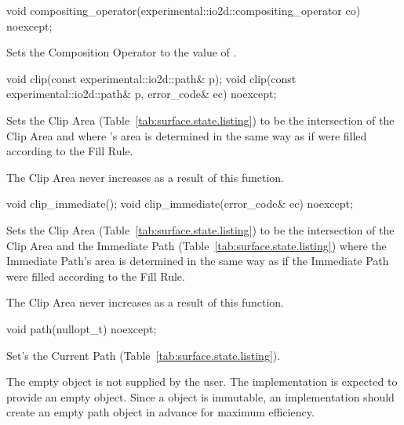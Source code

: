 \begin{itemdecl}
void compositing_operator(experimental::io2d::compositing_operator co)
  noexcept;
\end{itemdecl}
\begin{itemdescr}
\pnum
\effects
Sets the Composition Operator to the value of .
\end{itemdescr}

\begin{itemdecl}
void clip(const experimental::io2d::path& p);
void clip(const experimental::io2d::path& p, error_code& ec) noexcept;
\end{itemdecl}
\begin{itemdescr}
\pnum
\effects
Sets the Clip Area (Table~\ref{tab:surface.state.listing}) to be the intersection of the Clip Area and  where 's area is determined in the same way as if  were filled according to the Fill Rule.

\pnum
\realnotes
The Clip Area never increases as a result of this function.
\end{itemdescr}

\begin{itemdecl}
void clip_immediate();
void clip_immediate(error_code& ec) noexcept;
\end{itemdecl}
\begin{itemdescr}
\pnum
\effects
Sets the Clip Area (Table~\ref{tab:surface.state.listing}) to be the intersection of the Clip Area and the Immediate Path (Table~\ref{tab:surface.state.listing}) where the Immediate Path's area is determined in the same way as if the Immediate Path were filled according to the Fill Rule.

\pnum
\realnotes
The Clip Area never increases as a result of this function.
\end{itemdescr}

\begin{itemdecl}
void path(nullopt_t) noexcept;
\end{itemdecl}
\begin{itemdescr}
\pnum
\effects
Set's the Current Path (Table~\ref{tab:surface.state.listing}).

	\pnum
	\realnotes
	The empty  object is not supplied by the user. The implementation is expected to provide an empty  object. Since a  object is immutable, an implementation should create an empty path object in advance for maximum efficiency.
\end{itemdescr}


